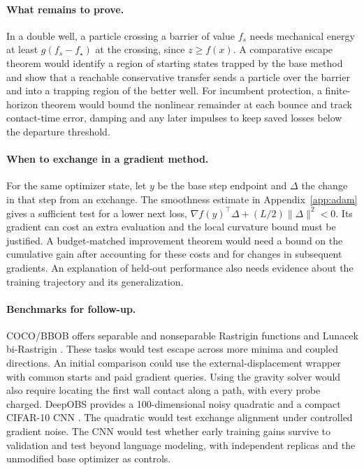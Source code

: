 \documentclass[10pt,letterpaper]{article}
\begin{document}
\paragraph{What remains to prove.}
In a double well, a particle crossing a barrier of value \(f_s\) needs mechanical energy at least \(g(f_s-f_\star)\) at the crossing, since \(z\ge f(x)\). A comparative escape theorem would identify a region of starting states trapped by the base method and show that a reachable conservative transfer sends a particle over the barrier and into a trapping region of the better well. For incumbent protection, a finite-horizon theorem would bound the nonlinear remainder at each bounce and track contact-time error, damping and any later impulses to keep saved losses below the departure threshold.

\paragraph{When to exchange in a gradient method.}
For the same optimizer state, let \(y\) be the base step endpoint and \(\Delta\) the change in that step from an exchange. The smoothness estimate in Appendix~\ref{app:adam} gives a sufficient test for a lower next loss,
\(\nabla f(y)^\top\Delta+(L/2)\|\Delta\|^2<0\).
Its gradient can cost an extra evaluation and the local curvature bound must be justified. A budget-matched improvement theorem would need a bound on the cumulative gain after accounting for these costs and for changes in subsequent gradients. An explanation of held-out performance also needs evidence about the training trajectory and its generalization.

\paragraph{Benchmarks for follow-up.}
COCO/BBOB offers separable and nonseparable Rastrigin functions and \mbox{Lunacek} bi-Rastrigin \cite{bbob}. These tasks would test escape across more minima and coupled directions. An initial comparison could use the external-displacement wrapper with common starts and paid gradient queries. Using the gravity solver would also require locating the first wall contact along a path, with every probe charged. \mbox{DeepOBS} provides a 100-dimensional noisy quadratic and a compact CIFAR-10 CNN \cite{deepobs}. The quadratic would test exchange alignment under controlled gradient noise. The CNN would test whether early training gains survive to validation and test beyond language modeling, with independent replicas and the unmodified base optimizer as controls.
\end{document}
